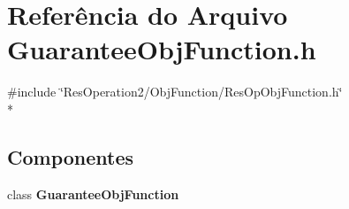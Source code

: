 \section{Referência do Arquivo Guarantee\+Obj\+Function.\+h}
\label{_2_obj_function_2_guarantee_2_guarantee_obj_function_8h}
{\ttfamily \#include \char`\"{}Res\+Operation2/\+Obj\+Function/\+Res\+Op\+Obj\+Function.\+h\char`\"{}}\\*
\subsection*{Componentes}
\begin{DoxyCompactItemize}
\item 
class {\bf Guarantee\+Obj\+Function}
\end{DoxyCompactItemize}
